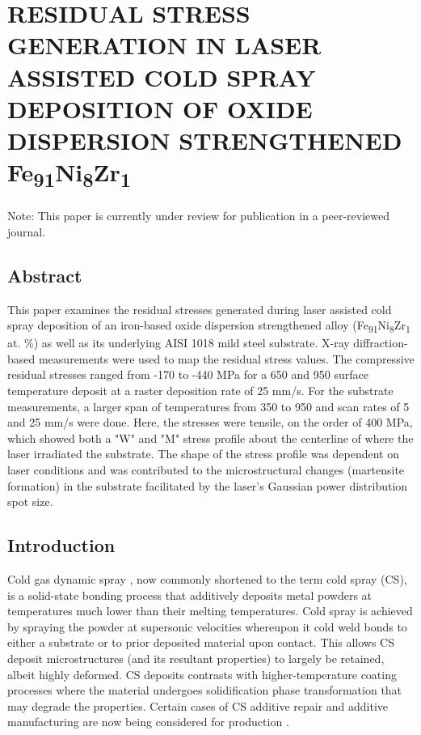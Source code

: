 \chapter{RESIDUAL STRESS GENERATION IN LASER ASSISTED COLD SPRAY DEPOSITION OF OXIDE DISPERSION STRENGTHENED Fe\textsubscript{91}Ni\textsubscript{8}Zr\textsubscript{1}}

Note: This paper is currently under review for publication in a peer-reviewed journal.

\section*{Abstract}

This paper examines the residual stresses generated during laser assisted cold spray deposition of an iron-based oxide dispersion strengthened alloy (Fe\textsubscript{91}Ni\textsubscript{8}Zr\textsubscript{1} at. $\%$) as well as its underlying AISI 1018 mild steel substrate. X-ray diffraction-based measurements were used to map the residual stress values. The compressive residual stresses ranged from -170 to -440 MPa for a 650 \celsius{} and 950 \celsius{} surface temperature deposit at a raster deposition rate of 25 mm/s. For the substrate measurements, a larger span of temperatures from 350 \celsius{} to 950 \celsius{} and scan rates of 5 and 25 mm/s were done. Here, the stresses were tensile, on the order of 400 MPa, which showed both a "W" and "M" stress profile about the centerline of where the laser irradiated the substrate.  The shape of the stress profile was dependent on laser conditions and was contributed to the microstructural changes (martensite formation) in the substrate facilitated by the laser’s Gaussian power distribution spot size. 

\section*{Introduction}

	Cold gas dynamic spray \cite{RN1403}, now commonly shortened to the term cold spray (CS), is a solid-state bonding process that additively deposits metal powders at temperatures much lower than their melting temperatures. Cold spray is achieved by spraying the powder at supersonic velocities whereupon it cold weld bonds to either a substrate or to prior deposited material upon contact. This allows CS deposit microstructures (and its resultant properties) to largely be retained, albeit highly deformed. CS deposits contrasts with higher-temperature coating processes where the material undergoes solidification phase transformation that may degrade the properties. Certain cases of CS additive repair and additive manufacturing are now being considered for production \cite{RN1405,RN435}. 


